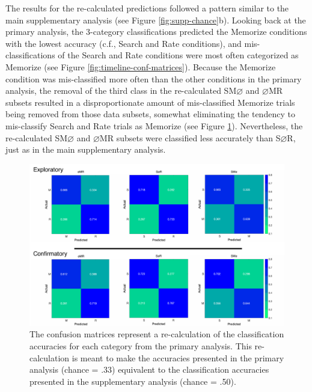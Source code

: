 \documentclass[
  english,
  man, donotrepeattitle,floatsintext]{apa6}
\begin{document}
The results for the re-calculated predictions followed a pattern similar to the main supplementary analysis (see Figure \ref{fig:supp-chance}b). Looking back at the primary analysis, the 3-category classifications predicted the Memorize conditions with the lowest accuracy (c.f., Search and Rate conditions), and mis-classifications of the Search and Rate conditions were most often categorized as Memorize (see Figure \ref{fig:timeline-conf-matrices}). Because the Memorize condition was mis-classified more often than the other conditions in the primary analysis, the removal of the third class in the re-calculated SM\(\varnothing\) and \(\varnothing\)MR subsets resulted in a disproportionate amount of mis-classified Memorize trials being removed from those data subsets, somewhat eliminating the tendency to mis-classify Search and Rate trials as Memorize (see Figure \ref{fig:recalc-conf-matrices}). Nevertheless, the re-calculated SM\(\varnothing\) and \(\varnothing\)MR subsets were classified less accurately than S\(\varnothing\)R, just as in the main supplementary analysis.

\begin{figure}
\centering
\includegraphics{figures/supp_analysis/recalculations/confusion_matrices/recalc_conf_matrices.pdf}
\caption{\label{fig:recalc-conf-matrices}The confusion matrices represent a re-calculation of the classification accuracies for each category from the primary analysis. This re-calculation is meant to make the accuracies presented in the primary analysis (chance = .33) equivalent to the classification accuracies presented in the supplementary analysis (chance = .50).}
\end{figure}
\end{document}
